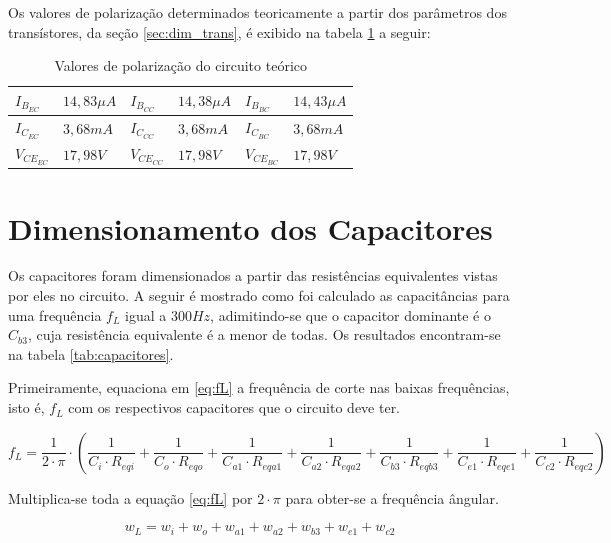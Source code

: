 \documentclass[openright]{normas-utf-tex} %
\begin{document}
Os valores de polarização determinados teoricamente a partir dos parâmetros dos transístores, da seção \ref{sec:dim_trans}, é exibido na tabela \ref{tab:pol_teorica} a seguir:

\begin{table}[H]
\centering
\caption{Valores de polarização do circuito teórico}
\label{tab:pol_teorica}
\begin{tabular}{|ll|ll|ll|}
\hline
$I_{B_{EC}}$  & $14,83\mu A$  & $I_{B_{CC}}$  & $14,38\mu A$  & $I_{B_{BC}}$  & $14,43\mu A$  \\ \hline
$I_{C_{EC}}$  & $3,68 mA$ & $I_{C_{CC}}$  & $3,68 mA$ & $I_{C_{BC}}$  & $3,68  mA$ \\ \hline
$V_{CE_{EC}}$ & $17,98V$      & $V_{CE_{CC}}$ & $17,98V$      & $V_{CE_{BC}}$ & $17,98V$      \\ \hline
\end{tabular}
\end{table}

\section{Dimensionamento dos Capacitores}

Os capacitores foram dimensionados a partir das resistências equivalentes vistas por eles no circuito. A seguir  é mostrado como foi calculado as capacitâncias para uma frequência $f_L$ igual a $300 Hz$, adimitindo-se que o capacitor dominante é o $C_{b3}$, cuja resistência equivalente é a menor de todas. Os resultados encontram-se na tabela \ref{tab:capacitores}.

	Primeiramente, equaciona em \ref{eq:fL} a frequência de corte nas baixas frequências, isto é, $f_L$ com os respectivos capacitores que o circuito deve ter.

\begin{equation}\label{eq:fL}
f_L = \frac{1}{2 \cdot \pi} \cdot \left( \frac{1}{C_i \cdot R_{eqi}} + \frac{1}{C_o \cdot R_{eqo}} + \frac{1}{C_{a1} \cdot R_{eqa1} }+ \frac{1}{C_{a2} \cdot R_{eqa2}} +\frac{1}{C_{b3} \cdot R_{eqb3}} + \frac{1}{C_{e1}\cdot R_{eqe1}} + \frac{1}{C_{c2}\cdot R_{eqc2}} \right)
\end{equation}

	Multiplica-se toda a equação \ref{eq:fL} por $2 \cdot \pi$ para obter-se a frequência ângular.

\begin{equation}
w_L = w_i + w_o + w_{a1} + w_{a2} + w_{b3} + w_{e1} + w_{c2}
\end{equation}
\end{document}
